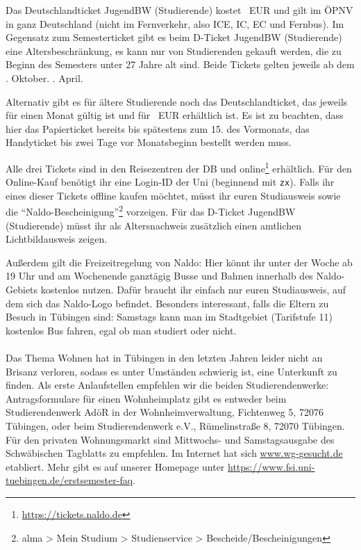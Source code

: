     Das Deutschlandticket JugendBW (Studierende) kostet \jugendticketbwpreis~EUR und gilt im ÖPNV in ganz Deutschland (nicht im Fernverkehr, also ICE, IC, EC und Fernbus). Im Gegensatz zum Semesterticket gibt es beim D-Ticket JugendBW (Studierende) eine Altersbeschränkung,
    es kann nur von Studierenden gekauft werden, die zu Beginn des Semesters unter 27 Jahre alt sind.
    Beide Tickets gelten jeweils ab dem
    . Oktober.
    \fi
    . April.
    \fi

    Alternativ gibt es für ältere Studierende noch das Deutschlandticket, das jeweils für einen Monat gültig ist und für \detickettuepreis~EUR erhältlich ist. 
    Es ist zu beachten, dass hier das Papierticket bereits bis spätestens zum 15. des Vormonats, das Handyticket bis zwei Tage vor Monatsbeginn bestellt werden muss.

    Alle drei Tickets sind in den Reisezentren der DB und online\footnote{\url{https://tickets.naldo.de}} erhältlich. Für den Online-Kauf benötigt ihr eine Login-ID der Uni (beginnend mit \texttt{zx}). Falls ihr eines dieser Tickets offline kaufen möchtet, müsst ihr euren Studiausweis
    sowie die "`Naldo-Bescheinigung"'\footnote{alma > Mein Studium > Studienservice > Bescheide/Bescheinigungen} vorzeigen. Für das D-Ticket JugendBW (Studierende) müsst ihr als Altersnachweis zusätzlich einen amtlichen Lichtbildausweis zeigen. 
    
    Außerdem gilt die Freizeitregelung von Naldo: Hier könnt ihr unter der Woche ab 19 Uhr und am Wochenende ganztägig Busse und Bahnen innerhalb des Naldo-Gebiets kostenlos nutzen. Dafür braucht ihr einfach nur euren Studiausweis, auf dem sich das Naldo-Logo befindet.
    Besonders interessant, falls die Eltern zu Besuch in Tübingen sind: Samstags kann man im Stadtgebiet (Tarifstufe 11) kostenlos Bus fahren, egal ob man studiert oder nicht. \\\\

    Das Thema Wohnen hat in Tübingen in den letzten Jahren leider nicht an Brisanz verloren, sodass
    es unter Umständen schwierig ist, eine Unterkunft zu finden. Als erste Anlaufstellen empfehlen wir
    die beiden Studierendenwerke: Antragsformulare für einen Wohnheimplatz gibt es entweder beim
    Studierendenwerk AdöR in der Wohnheimverwaltung, Fichtenweg 5, 72076 Tübingen, oder beim Studierendenwerk
    e.V., Rümelinstraße 8, 72070 Tübingen. Für den privaten Wohnungsmarkt sind Mittwochs- und Samstagsausgabe
    des Schwäbischen Tagblatts zu empfehlen.
    Im Internet hat sich \url{www.wg-gesucht.de} etabliert. Mehr gibt es auf unserer Homepage unter \url{https://www.fsi.uni-tuebingen.de/erstsemester-faq}.
    \fi
